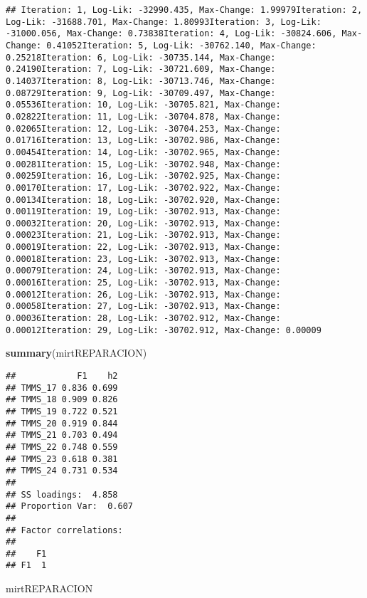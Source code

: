 \documentclass[
  10pt,
  spanish,
]{article}
\newenvironment{Shaded}{\begin{snugshade}}{\end{snugshade}}
\newcommand{\KeywordTok}[1]{\textcolor[rgb]{0.13,0.29,0.53}{\textbf{#1}}}
\newcommand{\NormalTok}[1]{#1}
\begin{document}
\begin{verbatim}
## Iteration: 1, Log-Lik: -32990.435, Max-Change: 1.99979Iteration: 2, Log-Lik: -31688.701, Max-Change: 1.80993Iteration: 3, Log-Lik: -31000.056, Max-Change: 0.73838Iteration: 4, Log-Lik: -30824.606, Max-Change: 0.41052Iteration: 5, Log-Lik: -30762.140, Max-Change: 0.25218Iteration: 6, Log-Lik: -30735.144, Max-Change: 0.24190Iteration: 7, Log-Lik: -30721.609, Max-Change: 0.14037Iteration: 8, Log-Lik: -30713.746, Max-Change: 0.08729Iteration: 9, Log-Lik: -30709.497, Max-Change: 0.05536Iteration: 10, Log-Lik: -30705.821, Max-Change: 0.02822Iteration: 11, Log-Lik: -30704.878, Max-Change: 0.02065Iteration: 12, Log-Lik: -30704.253, Max-Change: 0.01716Iteration: 13, Log-Lik: -30702.986, Max-Change: 0.00454Iteration: 14, Log-Lik: -30702.965, Max-Change: 0.00281Iteration: 15, Log-Lik: -30702.948, Max-Change: 0.00259Iteration: 16, Log-Lik: -30702.925, Max-Change: 0.00170Iteration: 17, Log-Lik: -30702.922, Max-Change: 0.00134Iteration: 18, Log-Lik: -30702.920, Max-Change: 0.00119Iteration: 19, Log-Lik: -30702.913, Max-Change: 0.00032Iteration: 20, Log-Lik: -30702.913, Max-Change: 0.00023Iteration: 21, Log-Lik: -30702.913, Max-Change: 0.00019Iteration: 22, Log-Lik: -30702.913, Max-Change: 0.00018Iteration: 23, Log-Lik: -30702.913, Max-Change: 0.00079Iteration: 24, Log-Lik: -30702.913, Max-Change: 0.00016Iteration: 25, Log-Lik: -30702.913, Max-Change: 0.00012Iteration: 26, Log-Lik: -30702.913, Max-Change: 0.00058Iteration: 27, Log-Lik: -30702.913, Max-Change: 0.00036Iteration: 28, Log-Lik: -30702.912, Max-Change: 0.00012Iteration: 29, Log-Lik: -30702.912, Max-Change: 0.00009
\end{verbatim}

\begin{Shaded}
\begin{Highlighting}[]
\KeywordTok{summary}\NormalTok{(mirtREPARACION)}
\end{Highlighting}
\end{Shaded}

\begin{verbatim}
##            F1    h2
## TMMS_17 0.836 0.699
## TMMS_18 0.909 0.826
## TMMS_19 0.722 0.521
## TMMS_20 0.919 0.844
## TMMS_21 0.703 0.494
## TMMS_22 0.748 0.559
## TMMS_23 0.618 0.381
## TMMS_24 0.731 0.534
## 
## SS loadings:  4.858 
## Proportion Var:  0.607 
## 
## Factor correlations: 
## 
##    F1
## F1  1
\end{verbatim}

\begin{Shaded}
\begin{Highlighting}[]
\NormalTok{mirtREPARACION}
\end{Highlighting}
\end{Shaded}
\end{document}
